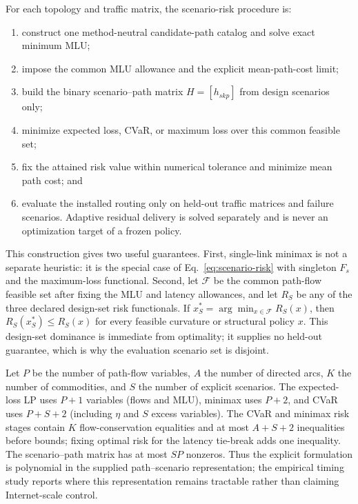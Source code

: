 \documentclass[preprint,12pt]{elsarticle}
\begin{document}
For each topology and traffic matrix, the scenario-risk procedure is:

\begin{enumerate}
\item construct one method-neutral candidate-path catalog and solve exact
minimum MLU;
\item impose the common MLU allowance and the explicit mean-path-cost limit;
\item build the binary scenario--path matrix $H=[h_{skp}]$ from design
scenarios only;
\item minimize expected loss, CVaR, or maximum loss over this common feasible
set;
\item fix the attained risk value within numerical tolerance and minimize mean
path cost; and
\item evaluate the installed routing only on held-out traffic matrices and
failure scenarios. Adaptive residual delivery is solved separately and is
never an optimization target of a frozen policy.
\end{enumerate}

This construction gives two useful guarantees. First, single-link minimax is
not a separate heuristic: it is the special case of Eq.~\eqref{eq:scenario-risk}
with singleton $F_s$ and the maximum-loss functional. Second, let
$\mathcal{F}$ be the common path-flow feasible set after fixing the MLU and
latency allowances, and let $R_S$ be any of the three declared design-set risk
functionals. If $x_S^*=\arg\min_{x\in\mathcal{F}}R_S(x)$, then
$R_S(x_S^*)\le R_S(x)$ for every feasible curvature or structural policy $x$.
This design-set dominance is immediate from optimality; it supplies no
held-out guarantee, which is why the evaluation scenario set is disjoint.

Let $P$ be the number of path-flow variables, $A$ the number of directed arcs,
$K$ the number of commodities, and $S$ the number of explicit scenarios. The
expected-loss LP uses $P+1$ variables (flows and MLU), minimax uses $P+2$, and
CVaR uses $P+S+2$ (including $\eta$ and $S$ excess variables). The CVaR and
minimax risk stages contain $K$ flow-conservation equalities and at most
$A+S+2$ inequalities before bounds; fixing optimal risk for the latency
tie-break adds one inequality. The scenario--path matrix has at most $SP$
nonzeros. Thus the explicit formulation is polynomial in the supplied
path--scenario representation; the empirical timing study reports where this
representation remains tractable rather than claiming Internet-scale control.
\end{document}
